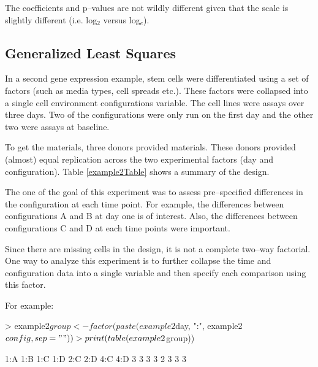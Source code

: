 \documentclass[12pt]{article}
\renewenvironment{Schunk}{\vspace{\topsep}}{\vspace{\topsep}}
\begin{document}
The coefficients and p--values are not wildly different given that the scale is slightly different (i.e. log$_2$ versus log$_e$).



\subsection{Generalized Least Squares}

In a second gene expression example, stem cells were differentiated using a set of factors (such as media types, cell spreads etc.). These factors were collapsed into a single cell environment configurations variable. The cell lines were assays over three days. Two of the configurations were only run on the first day and the other two were assays at baseline. 

To get the materials, three donors provided materials. These donors provided (almost) equal replication across the two experimental factors (day and configuration). Table \ref{example2Table} shows a summary of the design.



The one of the goal of this experiment was to assess pre--specified differences in the configuration at each time point. For example, the differences between configurations A and B at day one is of interest. Also, the differences between configurations C and D at each time points were important.

Since there are missing cells in the design, it is not a complete two--way factorial. One way to analyze this experiment is to further collapse the time and configuration data into a single variable and then specify each comparison using this factor.

For example:
\begin{Schunk}
\begin{Sinput}
> example2$group <- factor(paste(example2$day, ":", example2$config, sep = ""))
> print(table(example2$group))
\end{Sinput}
\begin{Soutput}
1:A 1:B 1:C 1:D 2:C 2:D 4:C 4:D 
  3   3   3   3   2   3   3   3 
\end{Soutput}
\end{Schunk}
\end{document}
